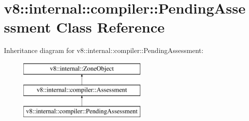 \hypertarget{classv8_1_1internal_1_1compiler_1_1PendingAssessment}{}\section{v8\+:\+:internal\+:\+:compiler\+:\+:Pending\+Assessment Class Reference}
\label{classv8_1_1internal_1_1compiler_1_1PendingAssessment}
Inheritance diagram for v8\+:\+:internal\+:\+:compiler\+:\+:Pending\+Assessment\+:\begin{figure}[H]
\begin{center}
\leavevmode
\includegraphics[height=3.000000cm]{classv8_1_1internal_1_1compiler_1_1PendingAssessment}
\end{center}
\end{figure}
